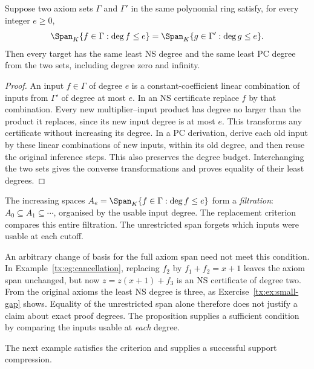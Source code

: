 \begin{proposition}\label{tx:prop:filtered-replacement}
Suppose two axiom sets $\Gamma$ and $\Gamma'$ in the same polynomial
ring satisfy, for every integer $e\ge0$,
\[
 \Span_K\{f\in\Gamma:\deg f\le e\}
       =\Span_K\{g\in\Gamma':\deg g\le e\}.
\]
Then every target has the same least NS degree and the same least PC
degree from the two sets, including degree zero and infinity.
\end{proposition}
\begin{proof}
An input $f\in\Gamma$ of degree $e$ is a constant-coefficient linear
combination of inputs from $\Gamma'$ of degree at most $e$. In an NS
certificate replace $f$ by that combination. Every new multiplier--input
product has degree no larger than the product it replaces, since its
new input degree is at most $e$. This transforms any certificate
without increasing its degree. In a PC derivation, derive each old
input by these linear combinations of new inputs, within its old
degree, and then reuse the original inference steps. This also
preserves the degree budget. Interchanging the two sets gives the
converse transformations and proves equality of their least degrees.
\end{proof}

The increasing spaces
$A_e=\Span_K\{f\in\Gamma:\deg f\le e\}$ form a \emph{filtration}:
$A_0\subseteq A_1\subseteq\cdots$, organised by the usable input degree.
The replacement criterion compares this entire filtration.
The unrestricted span forgets which inputs were usable at each cutoff.

An arbitrary change of basis for the full axiom span need not meet this
condition. In Example~\ref{tx:eg:cancellation}, replacing $f_2$ by
$f_1+f_2=x+1$ leaves the axiom span unchanged, but now
$z=z(x+1)+f_3$ is an NS certificate of degree two. From the original
axioms the least NS degree is three, as Exercise~\ref{tx:ex:small-gap}
shows. Equality of the unrestricted span alone therefore does not
justify a claim about exact proof degrees. The proposition supplies
a sufficient condition by comparing the inputs usable at \emph{each}
degree.

The next example satisfies the criterion and supplies a successful
support compression.

